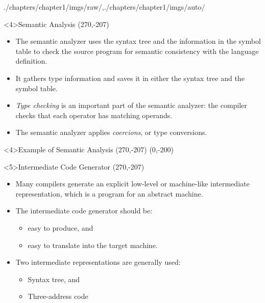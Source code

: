 \begin{graphicspathcontext}{{./chapters/chapter1/imgs/raw/},{./chapters/chapter1/imgs/auto/}}
\begin{bibunit}[apalike]
\begin{frame}<4>{Semantic Analysis}
	\putat(270,-207){}
	\begin{minipage}{.8\linewidth}
	\begin{itemize}
	\item The semantic analyzer uses the syntax tree and the information in the symbol table to check the source program for semantic consistency with the language definition.
	\vfill
	\item It gathers type information and saves it in either the syntax tree and the symbol table.
	\vfill
	\item \emph{Type checking} is an important part of the semantic analyzer: the compiler checks that each operator has matching operands.
	\vfill
	\item The semantic analyzer applies \emph{coercions}, or type conversions.
	\end{itemize}
	\end{minipage}
\end{frame}

\begin{frame}<4>{Example of Semantic Analysis}
	\putat(270,-207){}
	\putat(0,-200){}
\end{frame}

\begin{frame}<5>{Intermediate Code Generator}
	\putat(270,-207){}
	\begin{minipage}{.8\linewidth}
	\begin{itemize}
	\item Many compilers generate an explicit low-level or machine-like intermediate representation, which is a program for an abstract machine.
	\vfill
	\item The intermediate code generator should be: \begin{itemize}
		\item easy to produce, and
		\item easy to translate into the target machine.
		\end{itemize}
	\vfill
	\item Two intermediate representations are generally used: \begin{itemize}
		\item Syntax tree, and
		\item Three-address code
		\end{itemize}
	\end{itemize}
	\end{minipage}
\end{frame}


\end{bibunit}
\end{graphicspathcontext}
